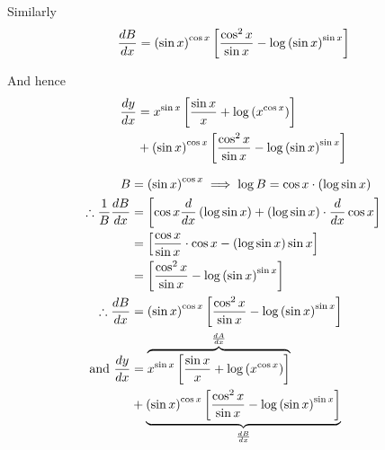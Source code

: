 \documentclass[14pt,fleqn]{extarticle}
\begin{document}
	\newcard 
	
	Similarly 
	\[ \frac{dB}{dx} = \left(\sin x \right)^{\cos x} \left[\frac{\cos^2 x}{\sin x} - \log \left(\sin x \right)^{\sin x} \right]\] 
	
	And hence 
	\begin{align}
	\frac{dy}{dx} &= x^{\sin x} \left[\frac{\sin x}{x} + \log \left(x^{\cos x} \right)\right] \\
	&+ \left(\sin x \right)^{\cos x} \left[\frac{\cos^2 x}{\sin x} - \log \left(\sin x \right)^{\sin x} \right]
\end{align}
	
	\newcard 
	
	\begin{align}
	   B &= \left(\sin x \right)^{\cos x} \implies \log B = \cos x\cdot \left(\log \sin x \right) \\
	   \therefore \frac{1}{B}\frac{dB}{dx} &= \left[\cos x \frac{d}{dx} \left(\log\sin x \right) + \left(\log \sin x \right)\cdot \frac{d}{dx}\cos x  \right] \\
	   &= \left[\frac{\cos x}{\sin x}\cdot \cos x - \left(\log \sin x \right)\sin x \right] \\
	   &= \left[\frac{\cos^2 x}{\sin x} - \log \left(\sin x \right)^{\sin x}\right] \\
	   \therefore \frac{dB}{dx} &= \left(\sin x \right)^{\cos x} \left[\frac{\cos^2 x}{\sin x} - \log \left(\sin x \right)^{\sin x}\right] \\
	   \text{and } \frac{dy}{dx} &= \overbrace{x^{\sin x} \left[\frac{\sin x}{x} + \log \left(x^{\cos x} \right)\right]}^{\frac{dA}{dx}} \\
	&+ \underbrace{\left(\sin x \right)^{\cos x} \left[\frac{\cos^2 x}{\sin x} - \log \left(\sin x \right)^{\sin x} \right]}_{\frac{dB}{dx}}
\end{align}
\end{document}
